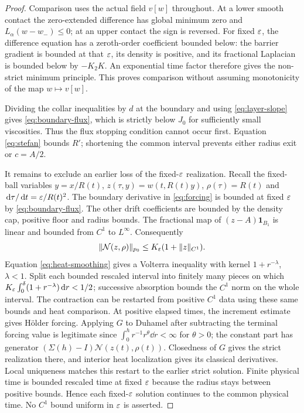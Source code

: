 \begin{proof}
Comparison uses the actual field $v[w]$ throughout. At a lower smooth
contact the zero-extended difference has global minimum zero and
$L_\alpha(w-w_-)\leq0$; at an upper contact the sign is reversed.
For fixed $\varepsilon$, the difference equation has a zeroth-order coefficient
bounded below: the barrier gradient is bounded at that $\varepsilon$, its density
is positive, and its fractional Laplacian is bounded below by $-K_2K$.
An exponential time factor therefore gives the non-strict minimum
principle. This proves comparison without assuming monotonicity of the
map $w\mapsto v[w]$.

Dividing the collar inequalities by $d$ at the boundary and using
\eqref{eq:layer-slope} gives \eqref{eq:boundary-flux}, which is strictly
below $J_0$ for sufficiently small viscosities. Thus the flux stopping
condition cannot occur first. Equation \eqref{eq:stefan} bounds $R'$;
shortening the common interval prevents either radius exit or $c=A/2$.

It remains to exclude an earlier loss of the fixed-$\varepsilon$ realization.
Recall the fixed-ball variables $y=x/R(t)$,
$z(\tau,y)=w(t,R(t)y)$, $\rho(\tau)=R(t)$ and
$\,\mathrm d\tau/\,\mathrm d t=\varepsilon/R(t)^2$.
The boundary derivative in \eqref{eq:forcing} is bounded at fixed $\varepsilon$
by \eqref{eq:boundary-flux}. The other drift coefficients are bounded by
the density cap, positive floor and radius bounds. The fractional map of
$(z-A)\mathbf1_{B_1}$ is linear and bounded from $C^1$ to $L^\infty$.
Consequently
\[
 \|\mathcal N(z,\rho)\|_{p_0}\leq K_\varepsilon(1+\|z\|_{C^1}).
\]
Equation \eqref{eq:heat-smoothing} gives a Volterra inequality with kernel
$1+r^{-\lambda}$, $\lambda<1$. Split each bounded rescaled interval into
finitely many pieces on which
$K_\varepsilon\int_0^\delta(1+r^{-\lambda})\,\mathrm d r<1/2$;
successive absorption bounds the $C^1$ norm on the whole interval.
The contraction can be restarted from positive $C^1$ data using these same
bounds and heat comparison. At positive elapsed times, the increment
estimate gives H\"older forcing. Applying $G$ to Duhamel after subtracting
the terminal forcing value is legitimate since
$\int_0^h r^{-1}r^\theta\dd r<\infty$ for $\theta>0$; the constant part
has generator $(\Sigma(h)-I)\mathcal N(z(t),\rho(t))$.
Closedness of $G$ gives the strict realization there, and interior heat
localization gives its classical derivatives. Local uniqueness matches
this restart to the earlier strict solution. Finite physical time is
bounded rescaled time at fixed $\varepsilon$ because the radius stays between
positive bounds. Hence each fixed-$\varepsilon$ solution continues to the common
physical time. No $C^1$ bound uniform in $\varepsilon$ is asserted.
\end{proof}
